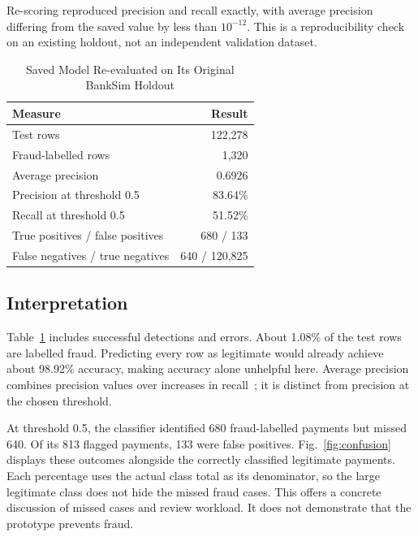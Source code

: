 \documentclass[conference]{IEEEtran}
\begin{document}
Re-scoring reproduced precision and recall exactly, with average precision differing from the saved value by less than $10^{-12}$. This is a reproducibility check on an existing holdout, not an independent validation dataset.

\begin{table}[t]
\caption{Saved Model Re-evaluated on Its Original BankSim Holdout}
\label{tab:model}
\centering\footnotesize
\begin{tabular}{@{}lr@{}}
\toprule
Measure & Result\\
\midrule
Test rows & 122,278\\
Fraud-labelled rows & 1,320\\
Average precision & 0.6926\\
Precision at threshold 0.5 & 83.64\%\\
Recall at threshold 0.5 & 51.52\%\\
True positives / false positives & 680 / 133\\
False negatives / true negatives & 640 / 120,825\\
\bottomrule
\end{tabular}
\end{table}

\subsection{Interpretation}
Table~\ref{tab:model} includes successful detections and errors. About 1.08\% of the test rows are labelled fraud. Predicting every row as legitimate would already achieve about 98.92\% accuracy, making accuracy alone unhelpful here. Average precision combines precision values over increases in recall~\cite{ap}; it is distinct from precision at the chosen threshold.

At threshold 0.5, the classifier identified 680 fraud-labelled payments but missed 640. Of its 813 flagged payments, 133 were false positives. Fig.~\ref{fig:confusion} displays these outcomes alongside the correctly classified legitimate payments. Each percentage uses the actual class total as its denominator, so the large legitimate class does not hide the missed fraud cases. This offers a concrete discussion of missed cases and review workload. It does not demonstrate that the prototype prevents fraud.
\end{document}
